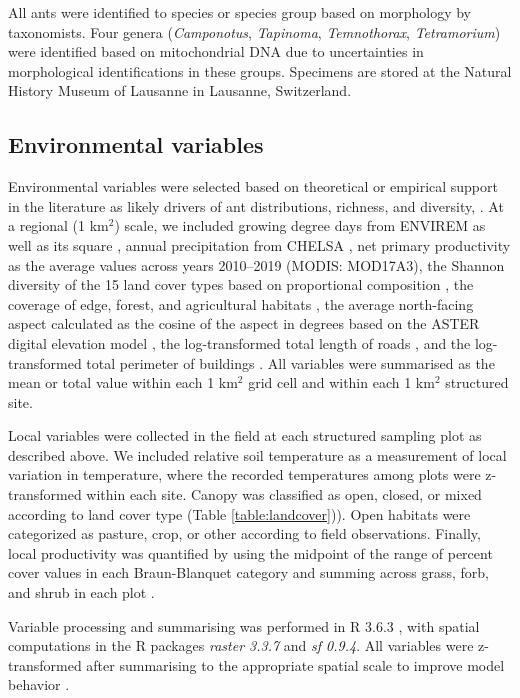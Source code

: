 \documentclass[preprint,final,times,12pt,3p]{elsarticle}
\begin{document}
All ants were identified to species or species group based on morphology by taxonomists. Four genera (\emph{Camponotus}, \emph{Tapinoma}, \emph{Temnothorax}, \emph{Tetramorium}) were identified based on mitochondrial DNA due to uncertainties in morphological identifications in these groups. Specimens are stored at the Natural History Museum of Lausanne in Lausanne, Switzerland. 


\subsection{Environmental variables}
Environmental variables were selected based on theoretical or empirical support in the literature as likely drivers of ant distributions, richness, and diversity, \citep{Bishop2017,Liu2018,Szewczyk2018,Longino2019,Uhey2020}. At a regional (1 km$^2$) scale, we included growing degree days from ENVIREM as well as its square \citep{Title2018}, annual precipitation from CHELSA \citep{Karger2017}, net primary productivity as the average values across years 2010–2019 (MODIS: MOD17A3), the Shannon diversity of the 15 land cover types based on proportional composition \citep{Gago-Silva2017}, the coverage of edge, forest, and agricultural habitats \citep{Gago-Silva2017}, the average north-facing aspect calculated as the cosine of the aspect in degrees based on the ASTER digital elevation model \citep{Tachikawa2011}, the log-transformed total length of roads \citep{OpenStreetMap}, and the log-transformed total perimeter of buildings \citep{OpenStreetMap}. All variables were summarised as the mean or total value within each 1 km$^2$ grid cell and within each 1 km$^2$ structured site.

Local variables were collected in the field at each structured sampling plot as described above. We included relative soil temperature as a measurement of local variation in temperature, where the recorded temperatures among plots were z-transformed within each site. Canopy was classified as open, closed, or mixed according to land cover type (Table \ref{table:landcover})). Open habitats were categorized as pasture, crop, or other according to field observations. Finally, local productivity was quantified by using the midpoint of the range of percent cover values in each Braun-Blanquet category and summing across grass, forb, and shrub in each plot \citep{Douglas1978,McCain2018,Szewczyk2018}.

Variable processing and summarising was performed in R 3.6.3 \citep{R-3-6-3}, with spatial computations in the R packages \emph{raster 3.3.7} and \emph{sf 0.9.4}. All variables were z-transformed after summarising to the appropriate spatial scale to improve model behavior \citep{Carpenter2017}.
\end{document}
